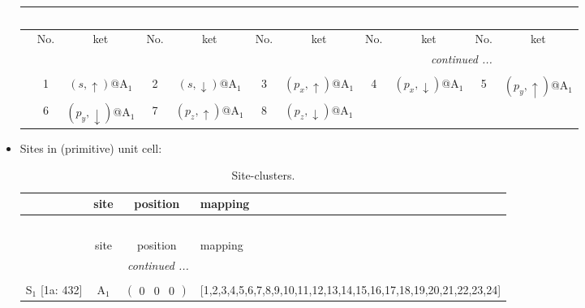 \documentclass[fleqn,10pt,landscape]{article}
\begin{document}
\begin{itemize}
\begin{center}
\begin{longtable}{c|cc|cc|cc|cc|cc}
\multicolumn{10}{l}{\tablename\ \thetable{}} \\
 \hline \hline
 & No. & ket & No. & ket & No. & ket & No. & ket & No. & ket \\ \hline \endhead

 \hline \hline
\multicolumn{10}{r}{\footnotesize\it continued ...} \\ \endfoot

 \hline \hline
\multicolumn{10}{r}{} \\ \endlastfoot

 & 1 & $(s,\uparrow)$@A$_{1}$ & 2 & $(s,\downarrow)$@A$_{1}$ & 3 & $(p_{x},\uparrow)$@A$_{1}$ & 4 & $(p_{x},\downarrow)$@A$_{1}$ & 5 & $(p_{y},\uparrow)$@A$_{1}$ \\
& 6 & $(p_{y},\downarrow)$@A$_{1}$ & 7 & $(p_{z},\uparrow)$@A$_{1}$ & 8 & $(p_{z},\downarrow)$@A$_{1}$ &  &  &  &  \\
\end{longtable}
\end{center}

\item Sites in (primitive) unit cell:
\begin{center}
\renewcommand{\arraystretch}{1.3}
\begin{longtable}{cc|c|l}
\caption{Site-clusters.}
 \\
 \hline \hline
 & site & position & mapping \\ \hline \endfirsthead

\multicolumn{3}{l}{\tablename\ \thetable{}} \\
 \hline \hline
 & site & position & mapping \\ \hline \endhead

 \hline \hline
\multicolumn{3}{r}{\footnotesize\it continued ...} \\ \endfoot

 \hline \hline
\multicolumn{3}{r}{} \\ \endlastfoot

S$_{1}$ [1a: 432] & A$_1$ & $\begin{pmatrix} 0 & 0 & 0 \end{pmatrix}$ & [1,2,3,4,5,6,7,8,9,10,11,12,13,14,15,16,17,18,19,20,21,22,23,24] \\
\end{longtable}
\end{center}


\end{itemize}
\end{document}
